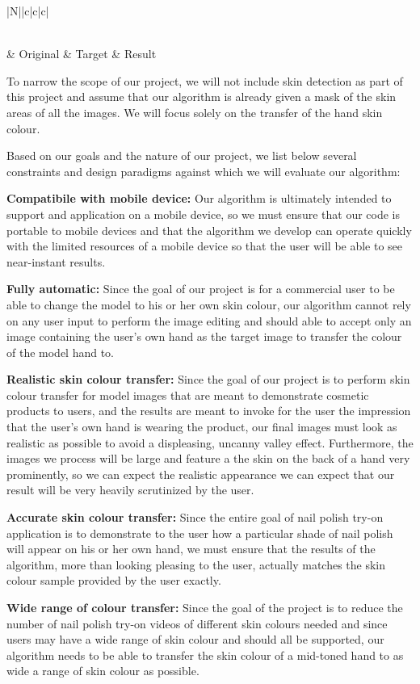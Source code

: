 \begin{longtable}{|N||c|c|c|}
	\caption{Example of our desired result given an original (the model) and a target image (from the user) \label{tab:our_demo}}\\
	\hline
	 & Original & Target & Result \\ 
	\hline
		
 \end{longtable}

To narrow the scope of our project, we will not include skin detection as part of this project and assume that our algorithm is already given a mask of the skin areas of all the images. We will focus solely on the transfer of the hand skin colour. 

Based on our goals and the nature of our project, we list below several constraints and design paradigms against which we will evaluate our algorithm:

\textbf{Compatibile with mobile device:} Our algorithm is ultimately intended to support and application on a mobile device, so we must ensure that our code is portable to mobile devices and that the algorithm we develop can operate quickly with the limited resources of a mobile device so that the user will be able to see near-instant results.

\textbf{Fully automatic:} Since the goal of our project is for a commercial user to be able to change the model to his or her own skin colour, our algorithm cannot rely on any user input to perform the image editing and should able to accept only an image containing the user's own hand as the target image to transfer the colour of the model hand to.

\textbf{Realistic skin colour transfer:}
Since the goal of our project is to perform skin colour transfer for model images that are meant to demonstrate cosmetic products to users, and the results are meant to invoke for the user the impression that the user's own hand is wearing the product, our final images must look as realistic as possible to avoid a displeasing, uncanny valley effect. Furthermore, the images we process will be large and feature a the skin on the back of a hand very prominently, so we can expect the realistic appearance we can expect that our result will be very heavily scrutinized by the user.

\textbf{Accurate skin colour transfer:} 
Since the entire goal of nail polish try-on application is to demonstrate to the user how a particular shade of nail polish will appear on his or her own hand, we must ensure that the results of the algorithm, more than looking pleasing to the user, actually matches the skin colour sample provided by the user exactly.

\textbf{Wide range of colour transfer:} Since the goal of the project is to reduce the number of nail polish try-on videos of different skin colours needed and since users may have a wide range of skin colour and should all be supported, our algorithm needs to be able to transfer the skin colour of a mid-toned hand to as wide a range of skin colour as possible.

